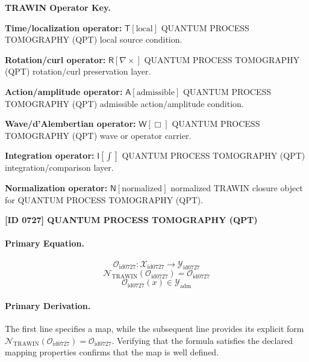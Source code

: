 \par\vspace{0.45\baselineskip}
\noindent\begin{minipage}[t]{\linewidth}
\begingroup
\small
\raggedright
\textbf{TRAWIN Operator Key.}\par
\noindent\textbf{Time/localization operator:} $\mathsf{T}\!\left[\mathrm{local}\right]$ QUANTUM PROCESS TOMOGRAPHY (QPT) local source condition.\par
\noindent\textbf{Rotation/curl operator:} $\mathsf{R}\!\left[\nabla\times\right]$ QUANTUM PROCESS TOMOGRAPHY (QPT) rotation/curl preservation layer.\par
\noindent\textbf{Action/amplitude operator:} $\mathsf{A}\!\left[\mathrm{admissible}\right]$ QUANTUM PROCESS TOMOGRAPHY (QPT) admissible action/amplitude condition.\par
\noindent\textbf{Wave/d'Alembertian operator:} $\mathsf{W}\!\left[\Box\right]$ QUANTUM PROCESS TOMOGRAPHY (QPT) wave or operator carrier.\par
\noindent\textbf{Integration operator:} $\mathsf{I}\!\left[\int\right]$ QUANTUM PROCESS TOMOGRAPHY (QPT) integration/comparison layer.\par
\noindent\textbf{Normalization operator:} $\mathsf{N}\!\left[\mathrm{normalized}\right]$ normalized TRAWIN closure object for QUANTUM PROCESS TOMOGRAPHY (QPT).\par
\endgroup
\end{minipage}

\clearpage
\noindent\textbf{[ID 0727] QUANTUM PROCESS TOMOGRAPHY (QPT)}\par
\vspace{0.35em}
\paragraph{Primary Equation.}
\[
\mathcal{O}_{\mathrm{id0727}}:\mathcal{X}_{\mathrm{id0727}}\longrightarrow\mathcal{Y}_{\mathrm{id0727}}
\]
\[
\mathcal{N}_{\mathrm{TRAWIN}}(\mathcal{O}_{\mathrm{id0727}})=\mathcal{O}_{\mathrm{id0727}}
\]
\[
\mathcal{O}_{\mathrm{id0727}}(x)\in\mathcal{Y}_{\mathrm{adm}}
\]

\paragraph{Primary Derivation.}
The first line specifies a map, while the subsequent line provides its explicit form \( \mathcal{N}_{\mathrm{TRAWIN}}(\mathcal{O}_{\mathrm{id0727}})=\mathcal{O}_{\mathrm{id0727}} \). Verifying that the formula satisfies the declared mapping properties confirms that the map is well defined.
